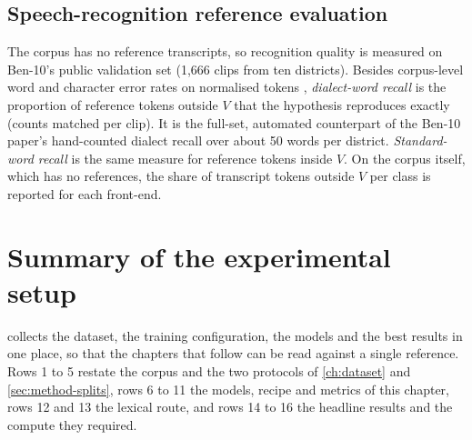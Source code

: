 \subsection{Speech-recognition reference evaluation}
\label{sec:method-ben10}

The corpus has no reference transcripts, so recognition quality is measured on
Ben-10's public validation set (1,666 clips from ten districts). Besides
corpus-level word and character error rates on normalised tokens
\cite{Jitsi2024JiWER}, \emph{dialect-word recall} is the proportion of
reference tokens outside $V$ that the hypothesis reproduces exactly (counts
matched per clip). It is the full-set, automated counterpart of the Ben-10
paper's hand-counted dialect recall over about 50 words per district.
\emph{Standard-word recall} is the same measure for reference tokens inside
$V$. On the corpus itself, which has no references, the share of transcript
tokens outside $V$ per class is reported for each front-end.

\section{Summary of the experimental setup}

 collects the dataset, the training configuration, the
models and the best results in one place, so that the chapters that follow can
be read against a single reference. Rows 1 to 5 restate the corpus and the two
protocols of \cref{ch:dataset} and \cref{sec:method-splits}, rows 6 to 11 the
models, recipe and metrics of this chapter, rows 12 and 13 the lexical route,
and rows 14 to 16 the headline results and the compute they required.

